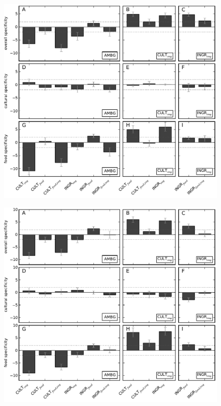 \documentclass[a4paper]{report}
\begin{document}
\begin{figure}
	\includegraphics[]{../specificity-allImages.pdf}
\end{figure}

\begin{figure}
	\includegraphics[]{../specificity-test0.pdf}
\end{figure}
\end{document}
